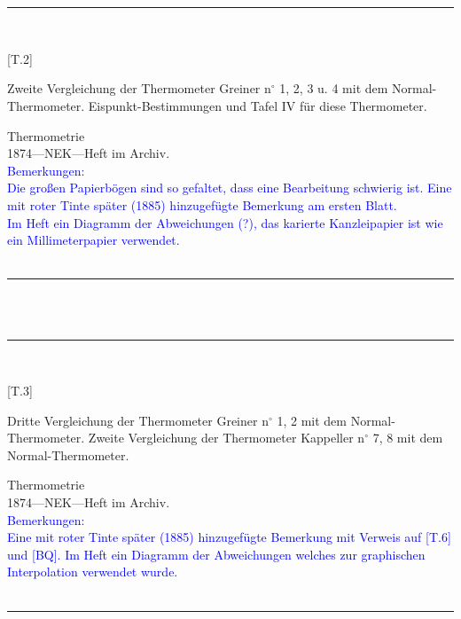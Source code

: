\\
\vspace*{-2.5pt}\\
\parbox{\textwidth}{%
\rule{\textwidth}{1pt}\vspace*{-3mm}\\
\begin{minipage}[t]{0.2\textwidth}\vspace{0pt}
\Huge\rule[-4mm]{0cm}{1cm}[T.2]
\end{minipage}
\hfill
\begin{minipage}[t]{0.8\textwidth}\vspace{0pt}
\large Zweite Vergleichung der Thermometer Greiner n{$^\circ$} 1, 2, 3 u. 4 mit dem Normal-Thermometer.  Eispunkt-Bestimmungen und Tafel IV für diese Thermometer.\rule[-2mm]{0mm}{2mm}
\end{minipage}
{\footnotesize\flushright
Thermometrie\\
}
1874\quad---\quad NEK\quad---\quad Heft im Archiv.\\
\textcolor{blue}{Bemerkungen:\\{}
Die großen Papierbögen sind so gefaltet, dass eine Bearbeitung schwierig ist. Eine mit roter Tinte später (1885) hinzugefügte Bemerkung am ersten Blatt.\\{}
Im Heft ein Diagramm der Abweichungen (?), das karierte Kanzleipapier ist wie ein Millimeterpapier verwendet.\\{}
}
\\[-15pt]
\rule{\textwidth}{1pt}
}
\\
\vspace*{-2.5pt}\\
\parbox{\textwidth}{%
\rule{\textwidth}{1pt}\vspace*{-3mm}\\
\begin{minipage}[t]{0.2\textwidth}\vspace{0pt}
\Huge\rule[-4mm]{0cm}{1cm}[T.3]
\end{minipage}
\hfill
\begin{minipage}[t]{0.8\textwidth}\vspace{0pt}
\large Dritte Vergleichung der Thermometer Greiner n{$^\circ$} 1, 2 mit dem Normal-Thermometer. Zweite Vergleichung der Thermometer Kappeller n{$^\circ$} 7, 8 mit dem Normal-Thermometer.\rule[-2mm]{0mm}{2mm}
\end{minipage}
{\footnotesize\flushright
Thermometrie\\
}
1874\quad---\quad NEK\quad---\quad Heft im Archiv.\\
\textcolor{blue}{Bemerkungen:\\{}
Eine mit roter Tinte später (1885) hinzugefügte Bemerkung mit Verweis auf [T.6] und [BQ]. Im Heft ein Diagramm der Abweichungen welches zur graphischen Interpolation verwendet wurde.\\{}
}
\\[-15pt]
\rule{\textwidth}{1pt}
}
